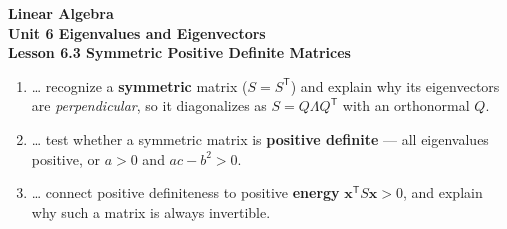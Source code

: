 \documentclass[10pt]{article}
\begin{document}
\vspace{-0.8in}

\begin{center}
  {\color{white}\textbf{\LARGE Linear Algebra}}\\[4pt]
  {\color{blushmid}\large\textbf{Unit 6 \quad Eigenvalues and Eigenvectors}}\\[6pt]
  {\color{white}\textbf{\large Lesson 6.3 \quad Symmetric Positive Definite Matrices}}
\end{center}

\vspace{0.22in}
\namedateperiod
\vspace{0.18in}

\begin{learningtargetbox}
\small
\begin{enumerate}[leftmargin=1.5em, itemsep=5pt]
  \item \ldots{} recognize a \textbf{symmetric} matrix ($S=S^{\mathsf T}$) and explain why its eigenvectors are \emph{perpendicular}, so it diagonalizes as $S=Q\Lambda Q^{\mathsf T}$ with an orthonormal $Q$.
  \item \ldots{} test whether a symmetric matrix is \textbf{positive definite} --- all eigenvalues positive, or $a>0$ and $ac-b^2>0$.
  \item \ldots{} connect positive definiteness to positive \textbf{energy} $\mathbf{x}^{\mathsf T}S\mathbf{x}>0$, and explain why such a matrix is always invertible.
\end{enumerate}
\end{learningtargetbox}

\vspace{0.14in}
\end{document}
